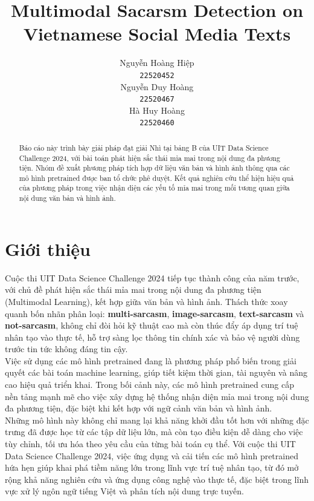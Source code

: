 \documentclass[11pt]{article}
\title{Multimodal Sacarsm Detection on Vietnamese Social Media Texts}
\author{Nguyễn Hoàng Hiệp \\
  \texttt{22520452} \\\And
  Nguyễn Duy Hoàng  \\
  \texttt{22520467} \\\And
    Hà Huy Hoàng  \\
  \texttt{22520460}\\}
\begin{document}
\maketitle
\begin{abstract}
Báo cáo này trình bày giải pháp đạt giải Nhì tại bảng B của UIT Data Science Challenge 2024, với bài toán phát hiện sắc thái mỉa mai trong nội dung đa phương tiện. Nhóm đề xuất phương pháp tích hợp dữ liệu văn bản và hình ảnh thông qua các mô hình pretrained được ban tổ chức phê duyệt. Kết quả nghiên cứu thể hiện hiệu quả của phương pháp trong việc nhận diện các yếu tố mỉa mai trong mối tương quan giữa nội dung văn bản và hình ảnh.
\end{abstract}

\section{Giới thiệu}
\hspace*{5mm} Cuộc thi UIT Data Science Challenge 2024 tiếp tục thành công của năm trước, với chủ đề phát hiện sắc thái mỉa mai trong nội dung đa phương tiện (Multimodal Learning), kết hợp giữa văn bản và hình ảnh. Thách thức xoay quanh bốn nhãn phân loại: \textbf{multi-sarcasm}, \textbf{image-sarcasm}, \textbf{text-sarcasm} và \textbf{not-sarcasm}, không chỉ đòi hỏi kỹ thuật cao mà còn thúc đẩy áp dụng trí tuệ nhân tạo vào thực tế, hỗ trợ sàng lọc thông tin chính xác và bảo vệ người dùng trước tin tức không đáng tin cậy.
\\
\hspace*{5mm} Việc sử dụng các mô hình pretrained đang là phương pháp phổ biến trong giải quyết các bài toán machine learning, giúp tiết kiệm thời gian, tài nguyên và nâng cao hiệu quả triển khai. Trong bối cảnh này, các mô hình pretrained cung cấp nền tảng mạnh mẽ cho việc xây dựng hệ thống nhận diện mỉa mai trong nội dung đa phương tiện, đặc biệt khi kết hợp với ngữ cảnh văn bản và hình ảnh.
\\
\hspace*{5mm} Những mô hình này không chỉ mang lại khả năng khởi đầu tốt hơn với những đặc trưng đã được học từ các tập dữ liệu lớn, mà còn tạo điều kiện dễ dàng cho việc tùy chỉnh, tối ưu hóa theo yêu cầu của từng bài toán cụ thể. Với cuộc thi UIT Data Science Challenge 2024, việc ứng dụng và cải tiến các mô hình pretrained hứa hẹn giúp khai phá tiềm năng lớn trong lĩnh vực trí tuệ nhân tạo, từ đó mở rộng khả năng nghiên cứu và ứng dụng công nghệ vào thực tế, đặc biệt trong lĩnh vực xử lý ngôn ngữ tiếng Việt và phân tích nội dung trực tuyến.
\end{document}
